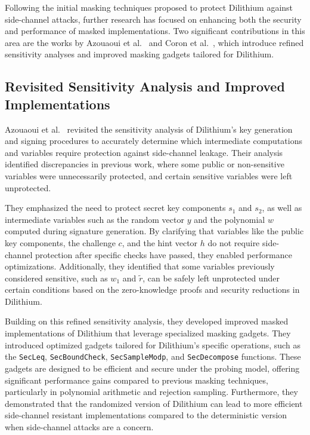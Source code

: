 Following the initial masking techniques proposed to protect Dilithium against side-channel attacks, further research has focused on enhancing both the security and performance of masked implementations. Two significant contributions in this area are the works by Azouaoui et al.~\cite{Azouaoui22} and Coron et al.~\cite{Coron23}, which introduce refined sensitivity analyses and improved masking gadgets tailored for Dilithium.

\subsection{Revisited Sensitivity Analysis and Improved Implementations}

Azouaoui et al.~\cite{Azouaoui22} revisited the sensitivity analysis of Dilithium's key generation and signing procedures to accurately determine which intermediate computations and variables require protection against side-channel leakage. Their analysis identified discrepancies in previous work, where some public or non-sensitive variables were unnecessarily protected, and certain sensitive variables were left unprotected.

They emphasized the need to protect secret key components $s_1$ and $s_2$, as well as intermediate variables such as the random vector $y$ and the polynomial $w$ computed during signature generation. By clarifying that variables like the public key components, the challenge $c$, and the hint vector $h$ do not require side-channel protection after specific checks have passed, they enabled performance optimizations. Additionally, they identified that some variables previously considered sensitive, such as $w_1$ and $\tilde{r}$, can be safely left unprotected under certain conditions based on the zero-knowledge proofs and security reductions in Dilithium.

Building on this refined sensitivity analysis, they developed improved masked implementations of Dilithium that leverage specialized masking gadgets. They introduced optimized gadgets tailored for Dilithium's specific operations, such as the \texttt{SecLeq}, \texttt{SecBoundCheck}, \texttt{SecSampleModp}, and \texttt{SecDecompose} functions. These gadgets are designed to be efficient and secure under the probing model, offering significant performance gains compared to previous masking techniques, particularly in polynomial arithmetic and rejection sampling. Furthermore, they demonstrated that the randomized version of Dilithium can lead to more efficient side-channel resistant implementations compared to the deterministic version when side-channel attacks are a concern.

